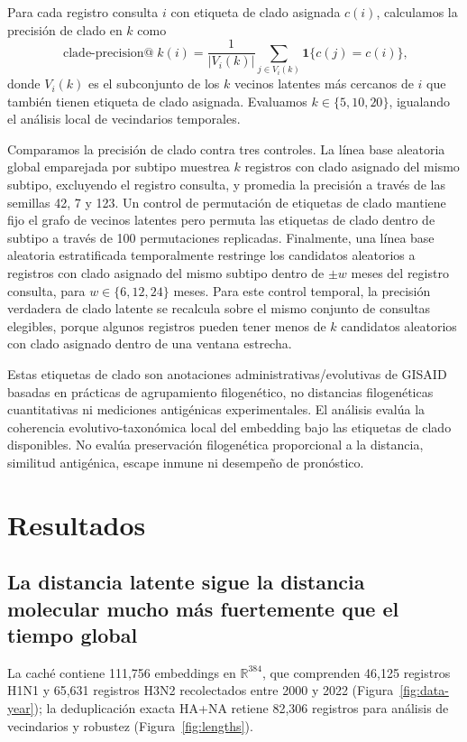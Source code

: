 \documentclass[11pt]{article}
\newcommand{\R}{\mathbb{R}}
\begin{document}
Para cada registro consulta $i$ con etiqueta de clado asignada $c(i)$, calculamos la precisión de clado en $k$ como
\[
\operatorname{clade\text{-}precision@}k(i)=
\frac{1}{|V_i(k)|}\sum_{j\in V_i(k)}\mathbf{1}\{c(j)=c(i)\},
\]
donde $V_i(k)$ es el subconjunto de los $k$ vecinos latentes más cercanos de $i$ que también tienen etiqueta de clado asignada. Evaluamos $k\in\{5,10,20\}$, igualando el análisis local de vecindarios temporales.

Comparamos la precisión de clado contra tres controles. La línea base aleatoria global emparejada por subtipo muestrea $k$ registros con clado asignado del mismo subtipo, excluyendo el registro consulta, y promedia la precisión a través de las semillas 42, 7 y 123. Un control de permutación de etiquetas de clado mantiene fijo el grafo de vecinos latentes pero permuta las etiquetas de clado dentro de subtipo a través de 100 permutaciones replicadas. Finalmente, una línea base aleatoria estratificada temporalmente restringe los candidatos aleatorios a registros con clado asignado del mismo subtipo dentro de $\pm w$ meses del registro consulta, para $w\in\{6,12,24\}$ meses. Para este control temporal, la precisión verdadera de clado latente se recalcula sobre el mismo conjunto de consultas elegibles, porque algunos registros pueden tener menos de $k$ candidatos aleatorios con clado asignado dentro de una ventana estrecha.

Estas etiquetas de clado son anotaciones administrativas/evolutivas de GISAID basadas en prácticas de agrupamiento filogenético, no distancias filogenéticas cuantitativas ni mediciones antigénicas experimentales. El análisis evalúa la coherencia evolutivo-taxonómica local del embedding bajo las etiquetas de clado disponibles. No evalúa preservación filogenética proporcional a la distancia, similitud antigénica, escape inmune ni desempeño de pronóstico.

\section{Resultados}

\subsection{La distancia latente sigue la distancia molecular mucho más fuertemente que el tiempo global}

La caché contiene 111,756 embeddings en $\R^{384}$, que comprenden 46,125 registros H1N1 y 65,631 registros H3N2 recolectados entre 2000 y 2022 (Figura~\ref{fig:data-year}); la deduplicación exacta HA+NA retiene 82,306 registros para análisis de vecindarios y robustez (Figura~\ref{fig:lengths}).
\end{document}
